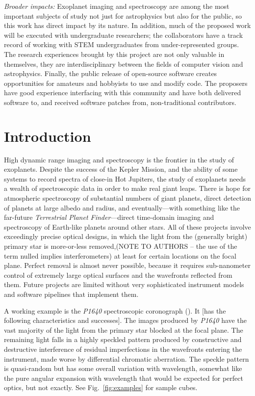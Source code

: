 \documentclass[12pt,pdftex,preprint]{aastex}
\newcommand{\project}[1]{\textsl{#1}}
\newcommand{\fig}[1]{Fig.\ \ref{fig:#1}}
\begin{document}
\textsl{Broader impacts:} Exoplanet imaging and spectroscopy are among
the most important subjects of study not just for astrophysics but
also for the public, so this work has direct impact by its nature.  In
addition, much of the proposed work will be executed with
undergraduate researchers; the collaborators have a track record of
working with STEM undergraduates from under-represented groups.  The
research experiences brought by this project are not only valuable in
themselves, they are interdisciplinary between the fields of computer
vision and astrophysics.  Finally, the public release of open-source
software creates opportunities for amateurs and hobbyists to use and
modify code.  The proposers have good experience interfacing with this
community and have both delivered software to, and received software
patches from, non-traditional contributors.

\clearpage
\section{Introduction}

High dynamic range imaging and spectroscopy is the frontier in
the study of exoplanets. Despite the success of the Kepler Mission,
and the ability of some systems to record spectra of close-in Hot
Jupiters, the study of exoplanets needs a wealth of spectroscopic data
in order to make real giant leaps.  There is hope for atmospheric
spectroscopy
of substantial numbers of giant planets, direct detection of planets
at large albedo and radius, and eventually---with something like the
far-future \project{Terrestrial Planet Finder}---direct time-domain
imaging and spectroscopy of Earth-like planets around other stars.
All of these projects involve exceedingly precise optical designs, in
which the light from the (generally bright) primary star is
more-or-less removed,(NOTE TO AUTHORS – the use of the term nulled
implies interferometers)  at least for certain locations on the focal
plane.  Perfect removal is almost never possible, because it requires
sub-nanometer control of extremely large optical surfaces and the
wavefronts reflected from them.  Future projects are limited
without very sophisticated instrument models and software pipelines
that implement them.

A working example is the \project{P1640} spectroscopic coronograph
(\citealt{p1640}).  It [has the following characteristics and
 successes].  The images produced by \project{P1640} have the vast
majority of the light from the primary star blocked at the focal plane.
The remaining light falls in a highly speckled pattern produced by
constructive and destructive interference of residual imperfections in
the wavefronts entering the instrument, made worse by differential
chromatic aberration.  The speckle pattern is quasi-random but has
some overall variation with wavelength, somewhat like the pure angular
expansion with wavelength that would be expected for perfect optics,
but not exactly. See \fig{examples} for sample cubes.
\end{document}

